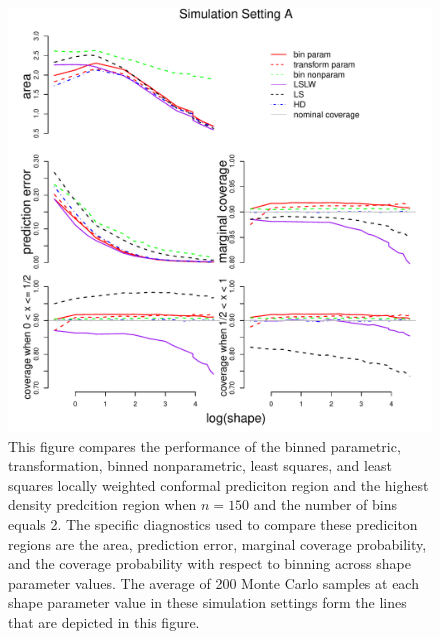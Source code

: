 \documentclass[11pt]{article}\usepackage[]{graphicx}\usepackage[]{color}
\makeatletter
\def\maxwidth{ %
  \ifdim\Gin@nat@width>\linewidth
    \linewidth
  \else
    \Gin@nat@width
  \fi
}
\newenvironment{knitrout}{}{} %
\makeatother
\begin{document}
\newpage
\begin{figure}[h!]
\begin{center}
\begin{knitrout}
\color{fgcolor}
\includegraphics[width=\maxwidth]{figure/Fig-gamma-150-1} 

\end{knitrout}
\end{center}
\caption{This figure compares the performance of the 
  binned parametric,
  transformation, 
  binned nonparametric,
  least squares, and 
  least squares locally weighted conformal prediciton region and the 
  highest density predcition region when $n = 150$ and the number of bins 
  equals 2.  
  The specific diagnostics used to compare these prediciton regions are the 
    area,
    prediction error, 
    marginal coverage probability,
    and the coverage probability with respect to binning  
    across shape parameter values.
  The average of 200 Monte Carlo samples at each shape parameter value in 
  these simulation settings form the lines that are depicted in this figure.}
\label{Fig:gamma.150}
\end{figure}
\end{document}
